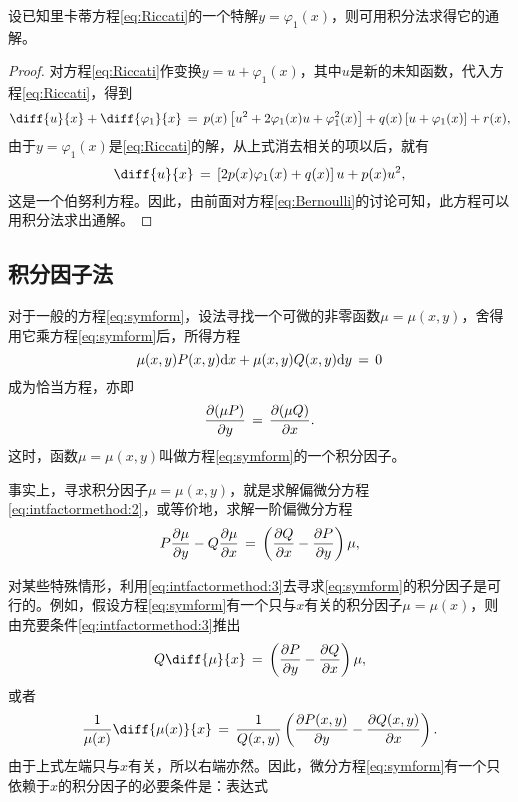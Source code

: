 \begin{theo}\label{theo:Riccati:sol}
设已知里卡蒂方程\eqref{eq:Riccati}的一个特解$y=\varphi_1(x)$，则可用积分法求得它的通解。
\end{theo}
\begin{proof}
对方程\eqref{eq:Riccati}作变换$y=u+\varphi_1(x)$，其中$u$是新的未知函数，代入方程\eqref{eq:Riccati}，得到
$$\diff{u}{x}+\diff{\varphi_1}{x}\,=\,p(x)\left[u^2+2\varphi_1(x)u+\varphi_1^2(x)\right]+q(x)\left[u+\varphi_1(x)\right]+r(x),$$
由于$y=\varphi_1(x)$是\eqref{eq:Riccati}的解，从上式消去相关的项以后，就有
$$\diff{u}{x}\,=\,\left[2p(x)\varphi_1(x)+q(x)\right]u+p(x)u^2,$$
这是一个伯努利方程。因此，由前面对方程\eqref{eq:Bernoulli}的讨论可知，此方程可以用积分法求出通解。
\end{proof}

\subsection{积分因子法}
对于一般的方程\eqref{eq:symform}，设法寻找一个可微的非零函数$\mu=\mu(x,y)$，舍得用它乘方程\eqref{eq:symform}后，所得方程
\begin{equation}\label{eq:intfactormethod:1}
\mu(x,y)P(x,y)\mathrm{d} x+\mu(x,y)Q(x,y)\mathrm{d} y\,=\,0
\end{equation}
成为恰当方程，亦即
\begin{equation}\label{eq:intfactormethod:2}
\frac{\partial{}(\mu P)}{\partial{}y}\,=\,\frac{\partial{}(\mu Q)}{\partial{}x}.
\end{equation}
这时，函数$\mu=\mu(x,y)$叫做方程\eqref{eq:symform}的一个{\heiti 积分因子}。\par
事实上，寻求积分因子$\mu=\mu(x,y)$，就是求解偏微分方程\eqref{eq:intfactormethod:2}，或等价地，求解一阶偏微分方程
\begin{equation}\label{eq:intfactormethod:3}
P\frac{\partial{}\mu}{\partial{}y}-Q\frac{\partial{}\mu}{\partial{}x}\,=\,\left(\frac{\partial{}Q}{\partial{}x}-\frac{\partial{}P}{\partial{}y}\right)\mu,
\end{equation}\par
对某些特殊情形，利用\eqref{eq:intfactormethod:3}去寻求\eqref{eq:symform}的积分因子是可行的。例如，假设方程\eqref{eq:symform}有一个只与$x$有关的积分因子$\mu=\mu(x)$，则由充要条件\eqref{eq:intfactormethod:3}推出
$$Q\diff{\mu}{x}\,=\,\left(\partialD{P}{y}-\partialD{Q}{x}\right)\mu,$$
或者
\begin{equation}\label{eq:intfactormethod:4}
\frac{1}{\mu(x)}\diff{\mu(x)}{x}\,=\,\frac{1}{Q(x,y)}\left(\partialD{P(x,y)}{y}-\partialD{Q(x,y)}{x}\right).
\end{equation}
由于上式左端只与$x$有关，所以右端亦然。因此，微分方程\eqref{eq:symform}有一个只依赖于$x$的积分因子的必要条件是：表达式
